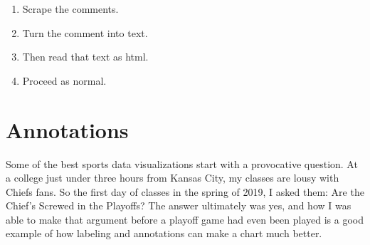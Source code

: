 \documentclass[
]{book}
\newenvironment{Shaded}{\begin{snugshade}}{\end{snugshade}}
\newcommand{\CommentTok}[1]{\textcolor[rgb]{0.56,0.35,0.01}{\textit{#1}}}
\newcommand{\DataTypeTok}[1]{\textcolor[rgb]{0.13,0.29,0.53}{#1}}
\newcommand{\KeywordTok}[1]{\textcolor[rgb]{0.13,0.29,0.53}{\textbf{#1}}}
\newcommand{\NormalTok}[1]{#1}
\newcommand{\OperatorTok}[1]{\textcolor[rgb]{0.81,0.36,0.00}{\textbf{#1}}}
\newcommand{\StringTok}[1]{\textcolor[rgb]{0.31,0.60,0.02}{#1}}
\providecommand{\tightlist}{%
  \setlength{\itemsep}{0pt}\setlength{\parskip}{0pt}}
\begin{document}
\begin{enumerate}
\def\labelenumi{\arabic{enumi}.}
\tightlist
\item
  Scrape the comments.
\item
  Turn the comment into text.
\item
  Then read that text as html.
\item
  Proceed as normal.
\end{enumerate}

\begin{Shaded}
\end{Shaded}

\hypertarget{annotations}{%
\chapter{Annotations}\label{annotations}}

Some of the best sports data visualizations start with a provocative question. At a college just under three hours from Kansas City, my classes are lousy with Chiefs fans. So the first day of classes in the spring of 2019, I asked them: Are the Chief's Screwed in the Playoffs? The answer ultimately was yes, and how I was able to make that argument before a playoff game had even been played is a good example of how labeling and annotations can make a chart much better.
\end{document}
